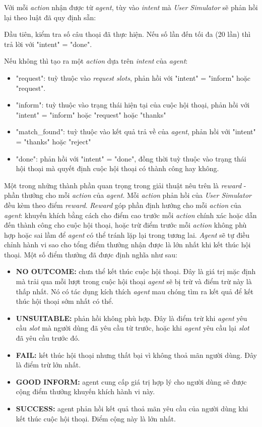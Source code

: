 Với mỗi \textit{action} nhận được từ \textit{agent}, tùy vào \textit{intent} mà \textit{User Simulator} sẽ phản hồi lại theo luật đã quy định sẵn:

Đầu tiên, kiểm tra số câu thoại đã thực hiện. Nếu số lần đến tối đa (20 lần) thì trả lời với "intent" = "done".

Nếu không thì tạo ra một \textit{action} dựa trên \textit{intent} của \textit{agent}:

\begin{itemize}
    \item "request": tuỳ thuộc vào \textit{request slots}, phản hồi với "intent" = "inform" hoặc "request".
    \item "inform": tuỳ thuộc vào trạng thái hiện tại của cuộc hội thoại, phản hồi với "intent" = "inform" hoặc "request" hoặc "thanks"
    \item "match\_found": tuỳ thuộc vào kết quả trả về của \textit{agent}, phản hồi với "intent" = "thanks" hoặc "reject"
    \item "done": phản hồi với "intent" = "done", đồng thời tuỳ thuộc vào trạng thái hội thoại mà quyết định cuộc hội thoại có thành công hay không.
\end{itemize}

Một trong những thành phần quan trọng trong giải thuật nêu trên là \textit{reward} - phần thưởng cho mỗi \textit{action} của \textit{agent}. Mỗi \textit{action} phản hồi của \textit{User Simulator} đều kèm theo điểm \textit{reward}. \textit{Reward} góp phần định hướng cho mỗi \textit{action} của \textit{agent}: khuyến khích bằng cách cho điểm cao trước mỗi \textit{action} chính xác hoặc dẫn đến thành công cho cuộc hội thoại, hoặc trừ điểm trước mỗi \textit{action} không phù hợp hoặc sai lầm để \textit{agent} có thể tránh lặp lại trong tương lai. \textit{Agent} sẽ tự điều chỉnh hành vi sao cho tổng điểm thưởng nhận được là lớn nhất khi kết thúc hội thoại. Một số điểm thưởng đã được định nghĩa như sau:

\begin{itemize}
    \item \textbf{NO OUTCOME:} chưa thể kết thúc cuộc hội thoại. Đây là giá trị mặc định mà trải qua mỗi lượt trong cuộc hội thoại \textit{agent} sẽ bị trừ và điểm trừ này là thấp nhất. Nó có tác dụng kích thích \textit{agent} mau chóng tìm ra kết quả để kết thúc hội thoại sớm nhất có thể.
    \item \textbf{UNSUITABLE:} phản hồi không phù hợp. Đây là điểm trừ khi \textit{agent} yêu cầu \textit{slot} mà người dùng đã yêu cầu từ trước, hoặc khi \textit{agent} yêu cầu lại \textit{slot} đã yêu cầu trước đó.
    \item \textbf{FAIL:} kết thúc hội thoại nhưng thất bại vì không thoả mãn người dùng. Đây là điểm trừ lớn nhất.
    \item \textbf{GOOD INFORM:} agent cung cấp giá trị hợp lý cho người dùng sẽ được cộng điểm thưởng khuyến khích hành vi này.
    \item \textbf{SUCCESS:} agent phản hồi kết quả thoả mãn yêu cầu của người dùng khi kết thúc cuộc hội thoại. Điểm cộng này là lớn nhất.
\end{itemize}

